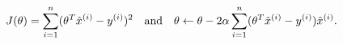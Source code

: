 \begin{answer}
	\[
	    J(\theta)
		=
		\sum_{i=1}^n(\theta^T\hat{x}^{(i)}-y^{(i)})^2
		\qand
		\theta \gets \theta
		-
		2\alpha 
		\sum^{n}_{i=1} (\theta^T\hat{x}^{(i)}-y^{(i)})\hat{x}^{(i)}
	.\] 
\end{answer}
